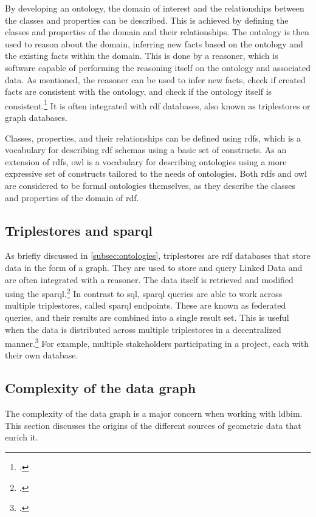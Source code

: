By developing an ontology, the domain of interest and the relationships between the classes and properties can be described. This is achieved by defining the classes and properties of the domain and their relationships. The ontology is then used to reason about the domain, inferring new facts based on the ontology and the existing facts within the domain. This is done by a reasoner, which is software capable of performing the reasoning itself on the ontology and associated data. As mentioned, the reasoner can be used to infer new facts, check if created facts are consistent with the ontology, and check if the ontology itself is consistent.\footcite{w3cInfering} It is often integrated with \ac{rdf} databases, also known as triplestores or graph databases.

Classes, properties, and their relationships can be defined using \ac{rdfs}, which is a vocabulary for describing \ac{rdf} schemas using a basic set of constructs. As an extension of \ac{rdfs}, \ac{owl} is a vocabulary for describing ontologies using a more expressive set of constructs tailored to the needs of ontologies. Both \ac{rdfs} and \ac{owl} are considered to be formal ontologies themselves, as they describe the classes and properties of the domain of \ac{rdf}.

\subsection{Triplestores and \acs{sparql}}
As briefly discussed in \ref{subsec:ontologies}, triplestores are \ac{rdf} databases that store data in the form of a graph. They are used to store and query Linked Data and are often integrated with a reasoner. The data itself is retrieved and modified using the \ac{sparql}.\footcite{w3cQuery} In contrast to \ac{sql}, \ac{sparql} queries are able to work across multiple triplestores, called \ac{sparql} endpoints. These are known as federated queries, and their results are combined into a single result set. This is useful when the data is distributed across multiple triplestores in a decentralized manner.\footcite{ontotextSpaql} For example, multiple stakeholders participating in a project, each with their own database.

\subsection{Complexity of the data graph}
The complexity of the data graph is a major concern when working with \ac{ldbim}. This section discusses the origins of the different sources of geometric data that enrich it.

